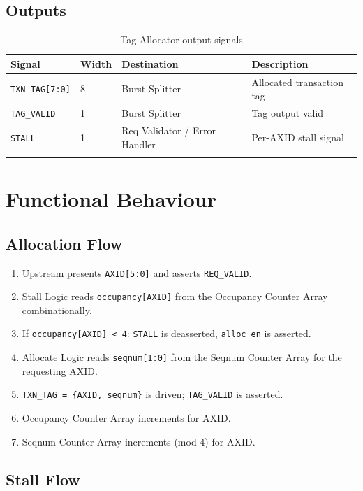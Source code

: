 \documentclass[11pt,a4paper]{article}
\begin{document}
\subsection{Outputs}

\begin{longtable}{llll}
\toprule
\textbf{Signal} & \textbf{Width} & \textbf{Destination} & \textbf{Description} \\
\midrule
\texttt{TXN\_TAG[7:0]} & 8 & Burst Splitter                & Allocated transaction tag \\
\texttt{TAG\_VALID}    & 1 & Burst Splitter                & Tag output valid \\
\texttt{STALL}         & 1 & Req Validator / Error Handler & Per-AXID stall signal \\
\bottomrule
\caption{Tag Allocator output signals}
\end{longtable}

\section{Functional Behaviour}

\subsection{Allocation Flow}

\begin{enumerate}
  \item Upstream presents \texttt{AXID[5:0]} and asserts
        \texttt{REQ\_VALID}.
  \item Stall Logic reads \texttt{occupancy[AXID]} from the Occupancy
        Counter Array combinationally.
  \item If \texttt{occupancy[AXID] < 4}: \texttt{STALL} is deasserted,
        \texttt{alloc\_en} is asserted.
  \item Allocate Logic reads \texttt{seqnum[1:0]} from the Seqnum
        Counter Array for the requesting AXID.
  \item \texttt{TXN\_TAG = \{AXID, seqnum\}} is driven; \texttt{TAG\_VALID}
        is asserted.
  \item Occupancy Counter Array increments for AXID.
  \item Seqnum Counter Array increments (mod 4) for AXID.
\end{enumerate}

\subsection{Stall Flow}
\end{document}
